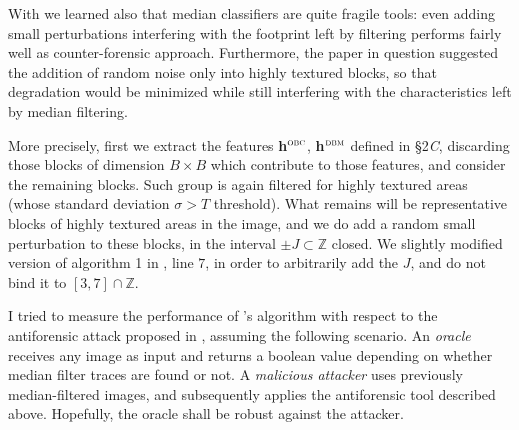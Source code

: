 \documentclass[10pt,a4paper]{report}
\newcommand{\strong}[1]{\textbf{#1}}
\begin{document}
With \cite{antiforensic} we learned also that median classifiers are quite fragile
tools: even adding small perturbations interfering with the
footprint left by filtering performs fairly well as counter-forensic approach.
Furthermore, the paper in question suggested the
addition of random noise only into highly textured blocks, so that degradation would
be minimized while still interfering with the characteristics left by median
filtering.

More precisely, first we extract the features \strong{h}$^{\textsc{obc}}$,
\strong{h}$^{\textsc{dbm}}$ defined in \cite{antiforensic} \S 2\textit{C},
discarding those blocks of dimension $B \times B$ which contribute to those features,
and consider the remaining blocks. Such group is again filtered for
highly textured areas (whose standard deviation $\sigma > T$ threshold). What
remains will be representative blocks of highly textured areas in the image, and
we do add a random small perturbation to these blocks, in the interval $\pm J
\subset \mathbb{Z}$ closed.
We slightly modified version of algorithm 1 in \cite{antiforensic}, line $7$, in
order to arbitrarily add the $J$, and do not bind it to $[3, 7] \cap \mathbb{Z}$.

I tried to measure the performance of \cite{mediantraces}'s algorithm with
respect to the antiforensic attack proposed in \cite{antiforensic}, assuming the
following scenario.
An \emph{oracle} receives any image as input and returns a boolean value
depending on whether median filter traces are found or not. A \emph{malicious attacker}
uses previously median-filtered images, and subsequently applies the
antiforensic tool described above. Hopefully, the oracle shall be robust
against the attacker.
\end{document}
